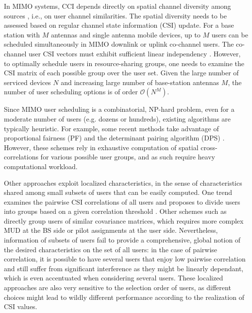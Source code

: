 In MIMO systems, CCI depends directly on spatial channel diversity among sources \cite{Eduardo17, Maciel10}, i.e., on 
user channel similarities. 
The spatial diversity needs to be assessed 
based on regular channel state information 
(CSI) update. 
For a base station with $M$ antennas and
single antenna mobile devices, 
up to $M$ users can be scheduled simultaneously
in MIMO downlink or uplink co-channel
users. The co-channel user CSI vectors 
must exhibit sufficient linear independency \cite{Hong03, Shiu00}. 
However, to optimally schedule users in resource-sharing groups, one needs to examine the CSI matrix of each possible group over the user set. 
Given the large number
of serviced devices $N$ and increasing large
number of base-station antennas $M$, the 
number of user scheduling options is of order
$\mathcal{O}(N^M)$. 

Since MIMO user scheduling is a combinatorial, NP-hard problem, even for a moderate number of users (e.g. dozens or hundreds),  
existing algorithms are typically heuristic.
For example, some recent methods take advantage of proportional fairness (PF) and the determinant pairing algorithm (DPS) \cite{Chen08, Chang16, wang11}. However, these schemes rely in exhaustive computation of spatial cross-correlations for various possible user groups, and as such require heavy computational workload. 

Other approaches exploit localized characteristics, in the sense of  characteristics shared among small subsets of users that can be easily computed. One trend examines the pairwise CSI correlations of all users and proposes to divide users into groups based on a given correlation threshold \cite{Zhang05, Kim15}. 
Other schemes such as \cite{Dhanushka19, Sharath19} directly group users of similar covariance matrices, which requires more complex MUD at the BS side or pilot assignments at the user side. 
Nevertheless, information of subsets of users fail to provide a comprehensive, global notion of the desired characteristics on the set of all users: in the case of pairwise correlation, it is possible to have several users that enjoy low pairwise correlation and still suffer from significant interference as they might be linearly dependant, which is even accentuated when considering several users. These localized approaches are also very sensitive to the selection order of users, as different choices might lead to wildly different performance according to the realization of CSI values. 

